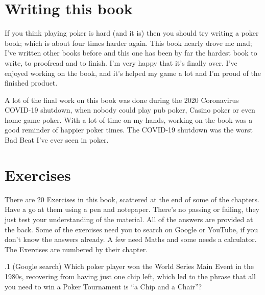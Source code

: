 \section*{Writing this book}

If you think playing poker is hard (and it is) then you should try
writing a poker book; which is about four times harder again. This book
nearly drove me mad; I've written other books before and this one has
been by far the hardest book to write, to proofread and to
finish. I'm very happy that it's finally over. I've enjoyed working on
the book, and it's helped my game a lot and I'm proud of the finished
product.

A lot of the final work on this book was done during the 2020
Coronavirus COVID-19 shutdown, when nobody could play pub poker,
Casino poker or even home game poker. With a lot of time on my hands,
working on the book was a good reminder of happier poker times. The
COVID-19 shutdown was the worst Bad Beat I've ever seen in poker.

\section*{Exercises}


There are 20 Exercises in this book, scattered at the end of some of
the chapters. Have a go at them using a pen and notepaper. There's no
passing or failing, they just test your understanding of the
material. All of the answers are provided at the back. Some of the
exercises need you to search on Google or YouTube, if you don't know
the answers already. A few need Maths and some needs a calculator. The
Exercises are numbered by their chapter.

.1 (Google search) Which poker player won the World
Series Main Event in the 1980s, recovering from having just one chip
left, which led to the phrase that all you need to win a Poker
Tournament is ``a Chip and a Chair''?
